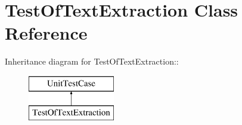 \hypertarget{class_test_of_text_extraction}{
\section{TestOfTextExtraction Class Reference}
\label{class_test_of_text_extraction}
}
Inheritance diagram for TestOfTextExtraction::\begin{figure}[H]
\begin{center}
\leavevmode
\includegraphics[height=2cm]{class_test_of_text_extraction}
\end{center}
\end{figure}
